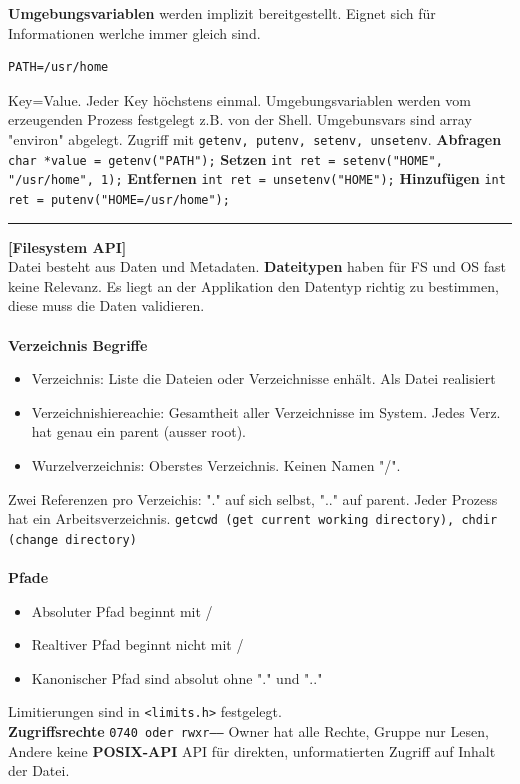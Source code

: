 \documentclass[8pt]{extarticle}
\let\oldtextbf\textbf
\renewcommand{\textbf}{\tiny\oldtextbf}
\begin{document}
\begin{multicols*}{5}
	\textbf{Umgebungsvariablen} werden implizit bereitgestellt. Eignet sich für Informationen werlche immer gleich sind.
	\begin{lstlisting}
PATH=/usr/home
	\end{lstlisting}
	Key=Value. Jeder Key höchstens einmal. Umgebungsvariablen werden vom erzeugenden Prozess festgelegt z.B. von der Shell. Umgebunsvars sind array "environ" abgelegt. Zugriff mit \texttt{getenv, putenv, setenv, unsetenv}.
	\textbf{Abfragen} \texttt{char *value = getenv("PATH");}
	\textbf{Setzen} \texttt{int ret = setenv("HOME", "/usr/home", 1);}
	\textbf{Entfernen} \texttt{int ret = unsetenv("HOME");}
	\textbf{Hinzufügen} \texttt{int ret = putenv("HOME=/usr/home");}
	\vspace{5pt}\\
	\rule{\linewidth}{0.4pt}
	\textbf{[Filesystem API]}\\
	Datei besteht aus Daten und Metadaten.
	\textbf{Dateitypen} haben für FS und OS fast keine Relevanz. Es liegt an der Applikation den Datentyp richtig zu bestimmen, diese muss die Daten validieren.\\\\
	\textbf{Verzeichnis Begriffe}
	\begin{itemize}[noitemsep, topsep=0pt, leftmargin=*]
		\item Verzeichnis: Liste die Dateien oder Verzeichnisse enhält. Als Datei realisiert
		\item Verzeichnishiereachie: Gesamtheit aller Verzeichnisse im System. Jedes Verz. hat genau ein parent (ausser root).
		\item Wurzelverzeichnis: Oberstes Verzeichnis. Keinen Namen "/".
	\end{itemize}
	Zwei Referenzen pro Verzeichis: "." auf sich selbst, ".." auf parent. Jeder Prozess hat ein Arbeitsverzeichnis. \texttt{getcwd (get current working directory), chdir (change directory)}\\\\
	\textbf{Pfade}
	\begin{itemize}[noitemsep, topsep=0pt, leftmargin=*]
		\item Absoluter Pfad beginnt mit /
		\item Realtiver Pfad beginnt nicht mit /
		\item Kanonischer Pfad sind absolut ohne "." und ".."
	\end{itemize}
	Limitierungen sind in \texttt{<limits.h>} festgelegt.\\
	\textbf{Zugriffsrechte} \texttt{0740 oder rwxr-----} Owner hat alle Rechte, Gruppe nur Lesen, Andere keine
	\textbf{POSIX-API} API für direkten, unformatierten Zugriff auf Inhalt der Datei.\\
	

\end{multicols*}
\end{document}
